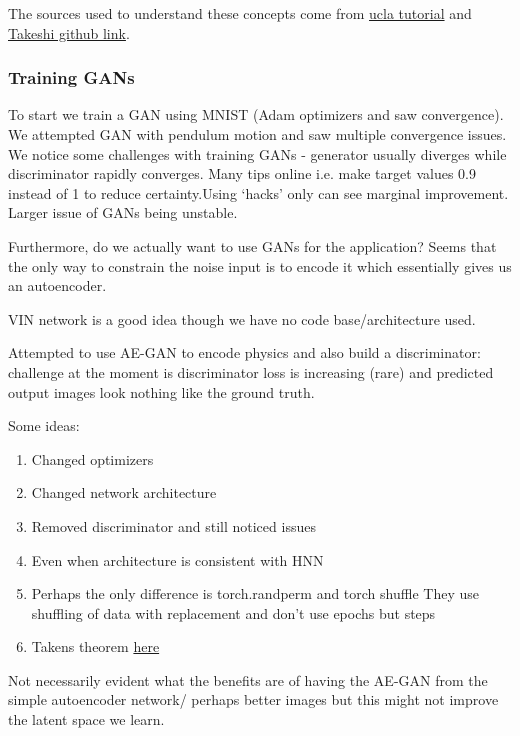 \documentclass{article}
\begin{document}
The sources used to understand these concepts come from \href{https://seas.ucla.edu/~kao/nndl/lectures/gans.pdf}{ucla tutorial} and \href{https://danieltakeshi.github.io/2017/03/05/understanding-generative-adversarial-networks/}{Takeshi github link}.



\subsubsection*{Training GANs}

To start we  train a GAN using MNIST (Adam optimizers and saw convergence). We attempted GAN with pendulum motion and saw multiple convergence issues. We notice some challenges with training GANs - generator usually diverges while discriminator rapidly converges. Many tips online i.e. make target values 0.9 instead of 1 to reduce certainty.Using ‘hacks’ only can see marginal improvement. Larger issue of GANs being unstable.

Furthermore, do we actually want to use GANs for the application? Seems that the only way to constrain the noise input is to encode it which essentially gives us an autoencoder.

VIN network is a good idea though we have no code base/architecture used.

Attempted to use AE-GAN to encode physics and also build a discriminator: challenge at the moment is discriminator loss is increasing (rare) and predicted output images look nothing like the ground truth. 

Some ideas:

\begin{enumerate}

\item Changed optimizers
\item Changed network architecture
\item Removed discriminator and still noticed issues
\item Even when architecture is consistent with HNN
\item Perhaps the only difference is torch.randperm and torch shuffle
They use shuffling of data with replacement and don’t use epochs but steps
\item Takens theorem \href{https://en.wikipedia.org/wiki/Takens%27s_theorem}{here}
\end{enumerate}


Not necessarily evident what the benefits are of having the AE-GAN from the simple autoencoder network/ perhaps better images but this might not improve the latent space we learn.
\end{document}
